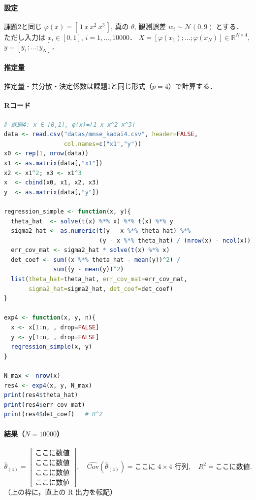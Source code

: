 \paragraph{設定}
課題2と同じ $\varphi(x)=[\,1\ x\ x^2\ x^3\,]$, 真の $\theta$, 観測誤差 $w_i\sim\mathcal{N}(0,9)$ とする．
ただし入力は $x_i\in[0,1]$, $i=1,\dots,10000$．
$X=[\varphi(x_1);\dots;\varphi(x_N)]\in\mathbb{R}^{N\times4}$, $y=[y_1;\dots;y_N]$．

\paragraph{推定量}
推定量・共分散・決定係数は課題1と同じ形式（$p=4$）で計算する．

\paragraph{Rコード}
\begin{lstlisting}[language=R]
# 課題4: x ∈ [0,1], φ(x)=[1 x x^2 x^3]
data <- read.csv("datas/mmse_kadai4.csv", header=FALSE,
                 col.names=c("x1","y"))
x0 <- rep(1, nrow(data))
x1 <- as.matrix(data[,"x1"])
x2 <- x1^2; x3 <- x1^3
x  <- cbind(x0, x1, x2, x3)
y  <- as.matrix(data[,"y"])

regression_simple <- function(x, y){
  theta_hat  <- solve(t(x) %*% x) %*% t(x) %*% y
  sigma2_hat <- as.numeric(t(y - x %*% theta_hat) %*%
                           (y - x %*% theta_hat) / (nrow(x) - ncol(x)))
  err_cov_mat <- sigma2_hat * solve(t(x) %*% x)
  det_coef <- sum((x %*% theta_hat - mean(y))^2) /
              sum((y - mean(y))^2)
  list(theta_hat=theta_hat, err_cov_mat=err_cov_mat,
       sigma2_hat=sigma2_hat, det_coef=det_coef)
}

exp4 <- function(x, y, n){
  x <- x[1:n, , drop=FALSE]
  y <- y[1:n, , drop=FALSE]
  regression_simple(x, y)
}

N_max <- nrow(x)
res4 <- exp4(x, y, N_max)
print(res4$theta_hat)
print(res4$err_cov_mat)
print(res4$det_coef)   # R^2
\end{lstlisting}

\paragraph{結果（$N=10000$）}
\[
\hat\theta_{(4)}=
\begin{bmatrix}
\boxed{\text{ここに数値}}\\
\boxed{\text{ここに数値}}\\
\boxed{\text{ここに数値}}\\
\boxed{\text{ここに数値}}
\end{bmatrix},\quad
\widehat{\mathrm{Cov}}(\hat\theta_{(4)})=\boxed{\text{ここに $4\times4$ 行列}},\quad
R^2=\boxed{\text{ここに数値}}.
\]
（上の枠に，直上の R 出力を転記）

